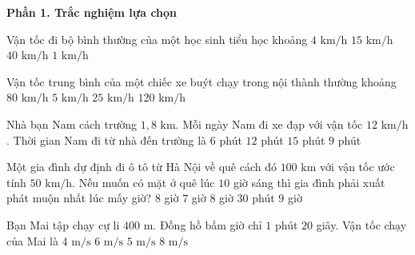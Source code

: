 \textbf{Phần 1. Trắc nghiệm lựa chọn}

\begin{ex} %
Vận tốc đi bộ bình thường của một học sinh tiểu học khoảng
\choice
{\True $4\text{ km/h}$}
{$15\text{ km/h}$}
{$40\text{ km/h}$}
{$1\text{ km/h}$}
\end{ex}

\begin{ex} %
Vận tốc trung bình của một chiếc xe buýt chạy trong nội thành thường khoảng
\choice
{$80\text{ km/h}$}
{$5\text{ km/h}$}
{\True $25\text{ km/h}$}
{$120\text{ km/h}$}
\end{ex}

\begin{ex} %
Nhà bạn Nam cách trường $1{,}8\text{ km}$. Mỗi ngày Nam đi xe đạp với vận tốc $12\text{ km/h}$. Thời gian Nam đi từ nhà đến trường là
\choice
{$6$ phút}
{$12$ phút}
{$15$ phút}
{\True $9$ phút}
\end{ex}

\begin{ex} %
Một gia đình dự định đi ô tô từ Hà Nội về quê cách đó $100\text{ km}$ với vận tốc ước tính $50\text{ km/h}$. Nếu muốn có mặt ở quê lúc $10$ giờ sáng thì gia đình phải xuất phát muộn nhất lúc mấy giờ?
\choice
{\True $8$ giờ}
{$7$ giờ}
{$8$ giờ $30$ phút}
{$9$ giờ}
\end{ex}

\begin{ex} %
Bạn Mai tập chạy cự li $400\text{ m}$. Đồng hồ bấm giờ chỉ $1$ phút $20$ giây. Vận tốc chạy của Mai là
\choice
{$4\text{ m/s}$}
{$6\text{ m/s}$}
{\True $5\text{ m/s}$}
{$8\text{ m/s}$}
\end{ex}

